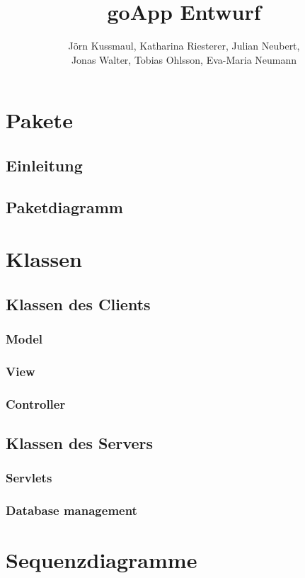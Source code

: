 \documentclass{report}
\title{goApp Entwurf}
\author{Jörn Kussmaul, Katharina Riesterer, Julian Neubert,\\ Jonas Walter, Tobias Ohlsson, Eva-Maria Neumann}
\begin{document}
	\maketitle
	\newpage
	\tableofcontents
	\newpage
	\section{Pakete}
	\subsection{Einleitung}
	\subsection{Paketdiagramm}
	\newpage
	\section{Klassen}
	\subsection{Klassen des Clients}
	\subsubsection{Model}
	\subsubsection{View}
	\subsubsection{Controller}
	\subsection{Klassen des Servers}
	\subsubsection{Servlets}
	\subsubsection{Database management}
	\newpage
	\section{Sequenzdiagramme}
	\newpage
\end{document}
